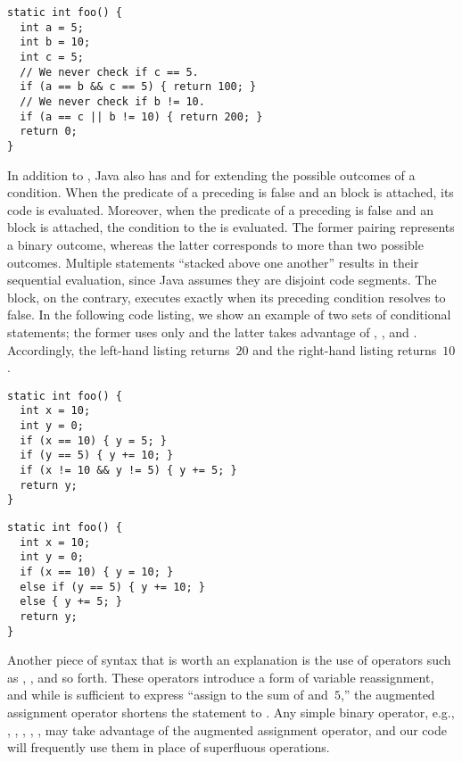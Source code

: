 \begin{lstlisting}[language=MyJava]
static int foo() {
  int a = 5;
  int b = 10;
  int c = 5;
  // We never check if c == 5.
  if (a == b && c == 5) { return 100; }
  // We never check if b != 10.
  if (a == c || b != 10) { return 200; }
  return 0;
}
\end{lstlisting}

In addition to , Java also has  and  for extending the possible outcomes of a condition. 
When the predicate of a preceding  is false and an  block is attached, its code is evaluated. 
Moreover, when the predicate of a preceding  is false and an  block is attached, the condition to the  is evaluated. 
The former pairing represents a binary outcome, whereas the latter corresponds to more than two possible outcomes. 
Multiple  statements ``stacked above one another'' results in their sequential evaluation, since Java assumes they are disjoint code segments. 
The  block, on the contrary, executes exactly when its preceding  condition resolves to false. 
In the following code listing, we show an example of two sets of conditional statements; the former uses only  and the latter takes advantage of , , and . 
Accordingly, the left-hand listing returns~$20$ and the right-hand listing returns~$10$.

\begin{clrr}[]{}
\begin{lstlisting}[language=MyJavaNF]
static int foo() {
  int x = 10;
  int y = 0;
  if (x == 10) { y = 5; } 
  if (y == 5) { y += 10; }
  if (x != 10 && y != 5) { y += 5; }
  return y;
}
\end{lstlisting}
\tcblower
\begin{lstlisting}[language=MyJavaNF]
static int foo() {
  int x = 10;
  int y = 0;
  if (x == 10) { y = 10; } 
  else if (y == 5) { y += 10; } 
  else { y += 5; }
  return y;
}
\end{lstlisting}
\end{clrr}

Another piece of syntax that is worth an explanation is the use of operators such as \ttt{+=}, \ttt{*=}, and so forth. 
These operators introduce a form of variable reassignment, and while  is sufficient to express ``assign to  the sum of  and~$5$,'' the augmented assignment operator shortens the statement to . 
Any simple binary operator, e.g., \ttt{+}, \ttt{-}, \ttt{*}, \ttt{/}, \ttt{\%}, may take advantage of the augmented assignment operator, and our code will frequently use them in place of superfluous operations.


